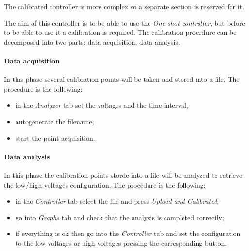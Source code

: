 The calibrated controller is more complex so a separate
section is reserved for it.



The aim of this controller is to be able to use the \emph{One shot
  controller}, but before to be able to use it a calibration is required. The calibration procedure can be decomposed into two parts:
data acquisition, data analysis.

\paragraph{Data acquisition}

In this phase several calibration points will be taken and stored into a file. The procedure
is the following:

\begin{itemize}
  \itemsep1pt\parskip0pt
  \item
        in the \emph{Analyzer} tab set the voltages and the time interval;
  \item
        autogenerate the filename;
  \item
        start the point acquisition.
\end{itemize}

\paragraph{Data analysis}

In this phase the calibration points storde into a
file will be analyzed to retrieve the low/high voltages configuration. The procedure is the following:

\begin{itemize}
  \itemsep1pt\parskip0pt
  \item
        in the \emph{Controller} tab select the file and press \emph{Upload
          and Calibrated};
  \item
        go into \emph{Graphs} tab and check that the analysis is completed
        correctly;
  \item
        if everything is ok then go into the \emph{Controller} tab and set the
        configuration to the low voltages or high voltages pressing the
        corresponding button.
\end{itemize}

